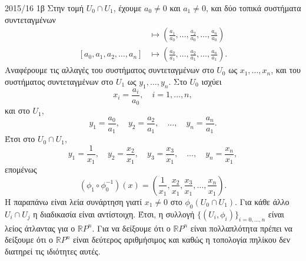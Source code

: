 \documentclass[a4paper,11pt]{article}
\begin{document}
\begin{solution}{2015/16 1β}
    Στην τομή \( U_0 \cap U_1 \), έχουμε \( a_0 \neq 0 \) και \( a_1 \neq 0 \),
    και δύο τοπικά συστήματα συντεταγμένων
    \begin{align*}
        [a_0, a_1, a_2, \dots, a_n] &\mapsto
        \left( \frac{a_1}{a_0}, \dots,
        \frac{a_2}{a_0}, \dots,\frac{a_n}{a_0} \right) \\
        [a_0, a_1, a_2, \dots, a_n] &\mapsto
        \left( \frac{a_0}{a_1}, \dots,
        \frac{a_2}{a_1}, \dots,\frac{a_n}{a_1} \right).
    \end{align*}
    Αναφέρουμε τις αλλαγές του συστήματος συντεταγμένων στο \( U_0 \) ως \(
    x_1, \dots, x_n \), και του συστήματος συντεταγμένων στο \( U_1 \) ως \(
    y_1, \dots, y_n \). Στο \( U_0 \) ισχύει
    \begin{equation*}
        x_i = \frac{a_i}{a_0}, \quad i = 1, \dots, n,
    \end{equation*}
    και στο \( U_1 \),
    \begin{equation*}
        y_1 = \frac{a_0}{a_1}, \quad y_2 = \frac{a_2}{a_1}, \quad \dots,
        \quad y_n = \frac{a_n}{a_1}.
    \end{equation*}
    Έτσι στο \( U_0 \cap U_1 \),
    \begin{equation*}
        y_1 = \frac{1}{x_1}, \quad
        y_2 = \frac{x_2}{x_1}, \quad
        y_3 = \frac{x_3}{x_1}, \quad
        \dots, \quad
        y_n = \frac{x_n}{x_1},
    \end{equation*}
    επομένως
    \begin{equation*}
        (\phi_1 \circ \phi_0^{-1})(x) =
        \left(
            \frac{1}{x_1},
            \frac{x_2}{x_1},
            \frac{x_3}{x_1},
            \dots,
            \frac{x_n}{x_1}
        \right).
    \end{equation*}
    Η παραπάνω είναι λεία συνάρτηση γιατί \( x_1 \neq 0 \) στο \( \phi_0(U_0
    \cap U_1) \). Για κάθε άλλο \( U_i \cap U_j \) η διαδικασία είναι
    αντίστοιχη. Έτσι, η συλλογή \( \{ (U_i, \phi_i) \}_{i=0,\dots,n} \) είναι
    λείος άτλαντας για ο \( \mathbb{R}P^n \). Για να δείξουμε ότι ο \( \mathbb{R}P^n \)
    είναι πολλαπλότητα πρέπει να δείξουμε ότι ο \( \mathbb{R}P^n \) είναι
    δεύτερος αριθμήσιμος και  καθώς η τοπολογία πηλίκου δεν
    διατηρεί τις ιδιότητες αυτές.


\end{solution}
\end{document}
